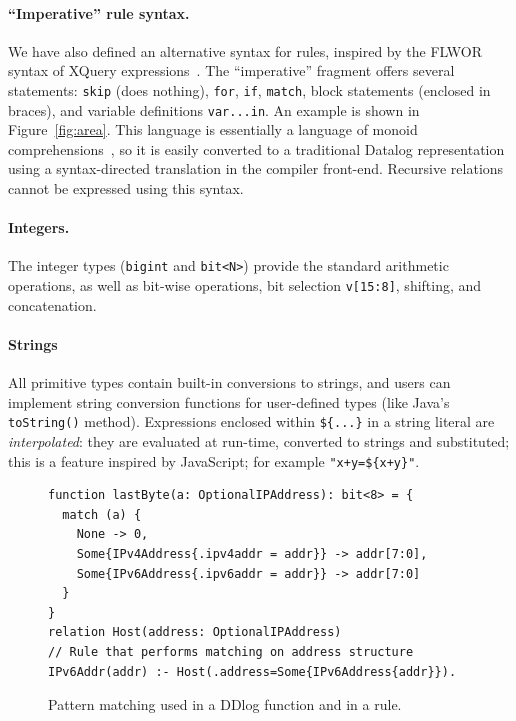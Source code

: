 \paragraph{``Imperative'' rule syntax.}
We have also defined an alternative syntax for rules, inspired by the
FLWOR syntax of XQuery expressions~\cite{boag-xquery02}.  The
``imperative'' fragment offers several statements: \texttt{skip} (does
nothing), \texttt{for}, \texttt{if}, \texttt{match}, block statements
(enclosed in braces), and variable definitions \texttt{var...in}.  An
example is shown in Figure~\ref{fig:area}.  This language is
essentially a language of monoid
comprehensions~\cite{fegaras-sigmod95}, so it is easily converted to a
traditional Datalog representation using a syntax-directed translation
in the compiler front-end.  Recursive relations cannot be expressed
using this syntax.

\paragraph{Integers.} The integer types (\texttt{bigint} and \texttt{bit<N>}) provide the
standard arithmetic operations, as well as bit-wise operations, bit
selection \texttt{v[15:8]}, shifting, and concatenation.

\paragraph{Strings} All primitive types contain built-in conversions to strings, and users
can implement string conversion functions for user-defined types (like
Java's \texttt{toString()} method).  Expressions enclosed within
\texttt{\$\{...\}} in a string literal are \emph{interpolated}: they
are evaluated at run-time, converted to strings and substituted; this
is a feature inspired by JavaScript; for example
\texttt{"x+y=\$\{x+y\}"}.

\begin{figure}[t]
  \footnotesize
  \begin{lstlisting}[language=ddlog]
function lastByte(a: OptionalIPAddress): bit<8> = {
  match (a) {
    None -> 0,
    Some{IPv4Address{.ipv4addr = addr}} -> addr[7:0],
    Some{IPv6Address{.ipv6addr = addr}} -> addr[7:0]
  }
}
relation Host(address: OptionalIPAddress)
// Rule that performs matching on address structure
IPv6Addr(addr) :- Host(.address=Some{IPv6Address{addr}}).
  \end{lstlisting}
\caption{Pattern matching used in a DDlog function and in a rule.\label{fig:function}}
\end{figure}

